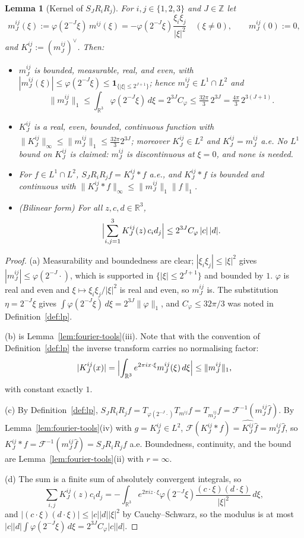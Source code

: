 \documentclass[11pt]{article}
\newtheorem{lemma}[theorem]{Lemma}
\theoremstyle{definition}
\theoremstyle{plain}
\newcommand{\R}{\mathbb R}
\newcommand{\norm}[1]{\lVert #1\rVert}
\begin{document}
\begin{lemma}[Kernel of $S_JR_iR_j$]\label{lem:riesz-kernel}
For $i,j\in\{1,2,3\}$ and $J\in\mathbb Z$ let
\[
 m^{ij}_J(\xi):=\varphi(2^{-J}\xi)\,m^{ij}(\xi)
 =-\varphi(2^{-J}\xi)\frac{\xi_i\xi_j}{|\xi|^2}\quad(\xi\ne0),
 \qquad m^{ij}_J(0):=0,
\]
and $K^{ij}_J:=(m^{ij}_J)^\vee$.  Then:
\begin{itemize}
\item[(a)] $m^{ij}_J$ is bounded, measurable, real, and even, with
$|m^{ij}_J(\xi)|\le\varphi(2^{-J}\xi)\le\mathbf 1_{\{|\xi|\le2^{J+1}\}}$; hence
$m^{ij}_J\in L^1\cap L^2$ and
\[
 \norm{m^{ij}_J}_1\le\int_{\R^3}\varphi(2^{-J}\xi)\,d\xi
 =2^{3J}C_\varphi\le\tfrac{32\pi}{3}\,2^{3J}
 =\tfrac{4\pi}{3}\,2^{3(J+1)} .
\]
\item[(b)] $K^{ij}_J$ is a real, even, bounded, continuous function with
$\norm{K^{ij}_J}_\infty\le\norm{m^{ij}_J}_1\le\frac{32\pi}{3}2^{3J}$; moreover
$K^{ij}_J\in L^2$ and $\widehat{K^{ij}_J}=m^{ij}_J$ a.e.  No $L^1$ bound on
$K^{ij}_J$ is claimed: $m^{ij}_J$ is discontinuous at $\xi=0$, and none is
needed.
\item[(c)] For $f\in L^1\cap L^2$, $S_JR_iR_jf=K^{ij}_J*f$ a.e., and
$K^{ij}_J*f$ is bounded and continuous with
$\norm{K^{ij}_J*f}_\infty\le\norm{m^{ij}_J}_1\norm f_1$.
\item[(d)] (Bilinear form) For all $z,c,d\in\R^3$,
\[
 \Bigl|\sum_{i,j=1}^3K^{ij}_J(z)\,c_id_j\Bigr|\le 2^{3J}C_\varphi\,|c|\,|d| .
\]
\end{itemize}
\end{lemma}

\begin{proof}
(a) Measurability and boundedness are clear; $|\xi_i\xi_j|\le|\xi|^2$ gives
$|m^{ij}_J|\le\varphi(2^{-J}\cdot)$, which is supported in
$\{|\xi|\le2^{J+1}\}$ and bounded by $1$.  $\varphi$ is real and even and
$\xi\mapsto\xi_i\xi_j/|\xi|^2$ is real and even, so $m^{ij}_J$ is.  The
substitution $\eta=2^{-J}\xi$ gives $\int\varphi(2^{-J}\xi)\,d\xi=2^{3J}\norm\varphi_1$,
and $C_\varphi\le32\pi/3$ was noted in Definition~\ref{def:lp}.

(b) is Lemma~\ref{lem:fourier-tools}(iii).  Note that with the convention of
Definition~\ref{def:lp} the inverse transform carries no normalising factor:
\[
 |K^{ij}_J(x)|
 =\Bigl|\int_{\R^3}e^{2\pi ix\cdot\xi}m^{ij}_J(\xi)\,d\xi\Bigr|
 \le\norm{m^{ij}_J}_1 ,
\]
with constant exactly $1$.

(c) By Definition~\ref{def:lp}, $S_JR_iR_jf=T_{\varphi(2^{-J}\cdot)}T_{m^{ij}}f
=T_{m^{ij}_J}f=\mathcal F^{-1}(m^{ij}_J\hat f)$.  By
Lemma~\ref{lem:fourier-tools}(iv) with $g=K^{ij}_J\in L^2$,
$\mathcal F(K^{ij}_J*f)=\widehat{K^{ij}_J}\hat f=m^{ij}_J\hat f$, so
$K^{ij}_J*f=\mathcal F^{-1}(m^{ij}_J\hat f)=S_JR_iR_jf$ a.e.  Boundedness,
continuity, and the bound are Lemma~\ref{lem:fourier-tools}(ii) with $r=\infty$.

(d) The sum is a finite sum of absolutely convergent integrals, so
\[
 \sum_{i,j}K^{ij}_J(z)c_id_j
 =-\int_{\R^3}e^{2\pi iz\cdot\xi}\varphi(2^{-J}\xi)\frac{(c\cdot\xi)(d\cdot\xi)}{|\xi|^2}\,d\xi ,
\]
and $|(c\cdot\xi)(d\cdot\xi)|\le|c||d||\xi|^2$ by Cauchy--Schwarz, so the
modulus is at most $|c||d|\int\varphi(2^{-J}\xi)\,d\xi=2^{3J}C_\varphi|c||d|$.
\end{proof}
\end{document}
